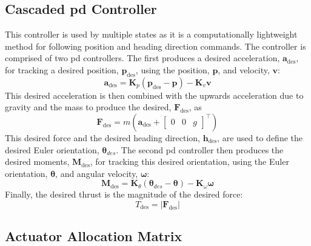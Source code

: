 \documentclass{report_template_oxford}
\begin{document}
\subsection{Cascaded \gls{pd} Controller} \label{cascadedPDController}
This controller is used by multiple states as it is a computationally lightweight method for following position and heading direction commands. The controller is comprised of two \gls{pd} controllers. The first produces a desired acceleration, $\mathbf{a}_{\mathrm{des}}$, for tracking a desired position, $\mathbf{p}_{\mathrm{des}}$, using the position, $\mathbf{p}$, and velocity, $\mathbf{v}$:
\begin{equation}
    \mathbf{a}_{\mathrm{des}} = \mathbf{K}_p (\mathbf{p}_{\mathrm{des}} - \mathbf{p}) - \mathbf{K}_v \mathbf{v}
\end{equation}
This desired acceleration is then combined with the upwards acceleration due to gravity and the mass to produce the desired, $\mathbf{F}_{\mathrm{des}}$, as
\begin{equation}
    \mathbf{F}_{\mathrm{des}} = m \left(\mathbf{a}_{\mathrm{des}} + \begin{bmatrix}
        0 &0&g
    \end{bmatrix}^\top \right)
\end{equation}
This desired force and the desired heading direction, $\mathbf{h}_{\mathrm{des}}$, are used to define the desired Euler orientation, $\boldsymbol{\theta}_{des}$. The second \gls{pd} controller then produces the desired moments, $\mathbf{M}_{\mathrm{des}}$, for tracking this desired orientation, using the Euler orientation, $\boldsymbol{\theta}$, and angular velocity, $\boldsymbol{\omega}$:
\begin{equation}
    \mathbf{M}_{\mathrm{des}} = \mathbf{K}_{\theta}(\boldsymbol{\theta}_{des} - \boldsymbol{\theta}) - \mathbf{K}_{\omega} \boldsymbol{\omega}
\end{equation}
Finally, the desired thrust is the magnitude of the desired force:
\begin{equation}
    T_{\mathrm{des}} = |\mathbf{F}_{\mathrm{des}}|
\end{equation}

\newpage
\subsection{Actuator Allocation Matrix} \label{mixing matrix} %
\end{document}
